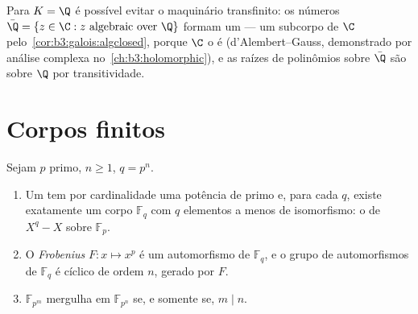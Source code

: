 \begin{remark}\label{rem:b3:galois:closureexamples}
Para $K = \Q$ é possível evitar o maquinário transfinito: os
números  $\bar\Q = \{z \in \C : z \text{ algebraic over
} \Q\}$ formam um  --- um subcorpo de
$\C$ pelo~\cref{cor:b3:galois:algclosed},  porque $\C$ o
é (d'Alembert--Gauss, demonstrado por análise complexa no~\cref{ch:b3:holomorphic}), e as raízes de polinômios sobre $\bar\Q$ são
 sobre $\Q$ por transitividade.
\end{remark}

\section{Corpos finitos}

\begin{theorem}\label{thm:b3:galois:finitefields}
Sejam $p$ primo, $n \geq 1$, $q = p^n$.
\begin{enumerate}
  \item Um  tem por cardinalidade uma potência de primo e,
        para cada $q$, existe exatamente um corpo $\mathbb F_q$ com
        $q$ elementos a menos de isomorfismo: o  de $X^q - X$ sobre $\mathbb F_p$.
  \item O \emph{Frobenius} $F
        \colon x \mapsto x^p$ é um
        automorfismo de $\mathbb
        F_q$, e o grupo de automorfismos de $\mathbb F_q$ é
        cíclico de ordem $n$, gerado por $F$.
  \item $\mathbb F_{p^m}$ mergulha em $\mathbb F_{p^n}$ se, e somente se, $m \mid
        n$.
\end{enumerate}
\end{theorem}

